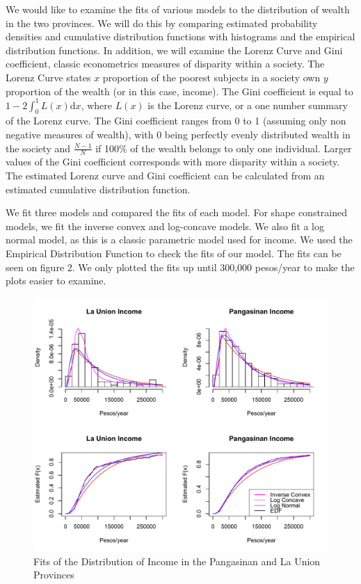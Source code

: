 \documentclass[11pt]{article}
\numberwithin{equation}{section}
\begin{document}
	We would like to examine the fits of various models to the distribution of wealth in the two provinces. We will do this by comparing estimated probability densities and cumulative distribution functions with histograms and the empirical distribution functions. In addition, we will examine the Lorenz Curve and Gini coefficient, classic econometrics measures of disparity within a society. The Lorenz Curve states $x$ proportion of the poorest subjects in a society own $y$ proportion of the wealth (or in this case, income). The Gini coefficient is equal to $1 - 2 \displaystyle \int_0^1 L(x) \mathrm{d}x$, where $L(x)$ is the Lorenz curve, or a one number summary of the Lorenz curve. The Gini coefficient ranges from 0 to 1 (assuming only non negative measures of wealth), with 0 being perfectly evenly distributed wealth in the society and $\frac{N-1} {N}$ if 100\% of the wealth belongs to only one individual. Larger values of the Gini coefficient corresponds with more disparity within a society. 	The estimated Lorenz curve and Gini coefficient can be  calculated from an estimated cumulative distribution function. 

	We  fit three models and compared the fits of each model. For shape constrained models, we  fit the inverse convex and log-concave models. We also fit a log normal model, as this is a classic parametric model used for income. We used the Empirical Distribution Function to check the fits of our model. The fits can be seen on figure 2. We only plotted the fits up until 300,000 pesos/year to make the plots easier to examine. 
	
	\begin{figure}
	\centerline{\includegraphics[width = 14cm]{MEDens.pdf} }
	\caption{Fits of the Distribution of Income in the Pangasinan and La Union Provinces}
	\end{figure} 	
	
\end{document}
